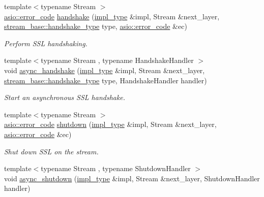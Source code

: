 \begin{DoxyCompactItemize}
{\footnotesize template$<$typename Stream $>$ }\\\hyperlink{classasio_1_1error__code}{asio\+::error\+\_\+code} \hyperlink{classasio_1_1ssl_1_1old_1_1stream__service_a0226834d3b6cd0a971a6f8cd60957384}{handshake} (\hyperlink{classasio_1_1ssl_1_1old_1_1stream__service_a7e2131ccd16fbc04d0f86c61288e4175}{impl\+\_\+type} \&impl, Stream \&next\+\_\+layer, \hyperlink{classasio_1_1ssl_1_1stream__base_a2f18813d3860bc8aee99249834d7c320}{stream\+\_\+base\+::handshake\+\_\+type} type, \hyperlink{classasio_1_1error__code}{asio\+::error\+\_\+code} \&ec)
\begin{DoxyCompactList}\small\item\em Perform S\+S\+L handshaking. \end{DoxyCompactList}\item 
{\footnotesize template$<$typename Stream , typename Handshake\+Handler $>$ }\\void \hyperlink{classasio_1_1ssl_1_1old_1_1stream__service_a3bbcf2939d42657aaab01f45e0a35e71}{async\+\_\+handshake} (\hyperlink{classasio_1_1ssl_1_1old_1_1stream__service_a7e2131ccd16fbc04d0f86c61288e4175}{impl\+\_\+type} \&impl, Stream \&next\+\_\+layer, \hyperlink{classasio_1_1ssl_1_1stream__base_a2f18813d3860bc8aee99249834d7c320}{stream\+\_\+base\+::handshake\+\_\+type} type, Handshake\+Handler handler)
\begin{DoxyCompactList}\small\item\em Start an asynchronous S\+S\+L handshake. \end{DoxyCompactList}\item 
{\footnotesize template$<$typename Stream $>$ }\\\hyperlink{classasio_1_1error__code}{asio\+::error\+\_\+code} \hyperlink{classasio_1_1ssl_1_1old_1_1stream__service_a7e150a7d86d8afcbbe3fb341d9f045f8}{shutdown} (\hyperlink{classasio_1_1ssl_1_1old_1_1stream__service_a7e2131ccd16fbc04d0f86c61288e4175}{impl\+\_\+type} \&impl, Stream \&next\+\_\+layer, \hyperlink{classasio_1_1error__code}{asio\+::error\+\_\+code} \&ec)
\begin{DoxyCompactList}\small\item\em Shut down S\+S\+L on the stream. \end{DoxyCompactList}\item 
{\footnotesize template$<$typename Stream , typename Shutdown\+Handler $>$ }\\void \hyperlink{classasio_1_1ssl_1_1old_1_1stream__service_a1ab258ac73bc995cec4133407b16bd79}{async\+\_\+shutdown} (\hyperlink{classasio_1_1ssl_1_1old_1_1stream__service_a7e2131ccd16fbc04d0f86c61288e4175}{impl\+\_\+type} \&impl, Stream \&next\+\_\+layer, Shutdown\+Handler handler)

\end{DoxyCompactItemize}
